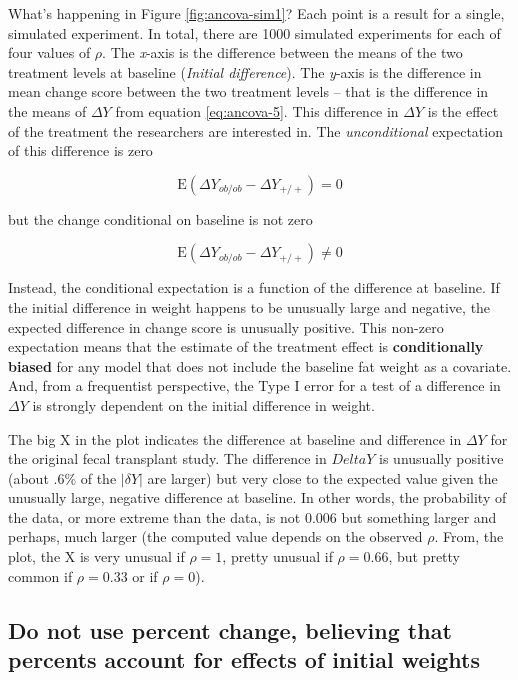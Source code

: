 \documentclass[]{book}
\begin{document}
What's happening in Figure \ref{fig:ancova-sim1}? Each point is a result
for a single, simulated experiment. In total, there are 1000 simulated
experiments for each of four values of \(\rho\). The \emph{x}-axis is
the difference between the means of the two treatment levels at baseline
(\emph{Initial difference}). The \emph{y}-axis is the difference in mean
change score between the two treatment levels -- that is the difference
in the means of \(\Delta Y\) from equation \eqref{eq:ancova-5}. This
difference in \(\Delta Y\) is the effect of the treatment the
researchers are interested in. The \emph{unconditional} expectation of
this difference is zero

\begin{equation}
\mathrm{E}(\Delta Y_{ob/ob} - \Delta Y_{+/+}) = 0
\end{equation}

but the change conditional on baseline is not zero

\begin{equation}
\mathrm{E}(\Delta Y_{ob/ob} - \Delta Y_{+/+}) \ne 0
\end{equation}

Instead, the conditional expectation is a function of the difference at
baseline. If the initial difference in weight happens to be unusually
large and negative, the expected difference in change score is unusually
positive. This non-zero expectation means that the estimate of the
treatment effect is \textbf{conditionally biased} for any model that
does not include the baseline fat weight as a covariate. And, from a
frequentist perspective, the Type I error for a test of a difference in
\(\Delta Y\) is strongly dependent on the initial difference in weight.

The big X in the plot indicates the difference at baseline and
difference in \(\Delta Y\) for the original fecal transplant study. The
difference in \(Delta Y\) is unusually positive (about .6\% of the
\(|\delta Y|\) are larger) but very close to the expected value given
the unusually large, negative difference at baseline. In other words,
the probability of the data, or more extreme than the data, is not 0.006
but something larger and perhaps, much larger (the computed value
depends on the observed \(\rho\). From, the plot, the X is very unusual
if \(\rho=1\), pretty unusual if \(\rho=0.66\), but pretty common if
\(\rho=0.33\) or if \(\rho=0\)).

\subsection{Do not use percent change, believing that percents account
for effects of initial
weights}\label{do-not-use-percent-change-believing-that-percents-account-for-effects-of-initial-weights}
\end{document}
